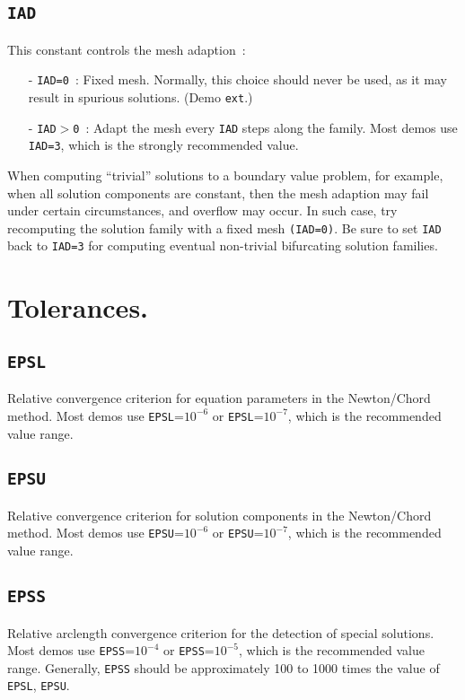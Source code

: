 \documentclass[12pt]{report}
\begin{document}
\subsection{\tt IAD} \label{sec:IAD}
This constant controls the mesh adaption~: 
\begin{itemize}
\item[-] {\tt IAD=0}~:
  Fixed mesh. Normally, this choice should never be used, as it may result
  in spurious solutions. (Demo {\tt ext}.)
\item[-] {\tt IAD$>$0}~:  
  Adapt the mesh every {\tt IAD} steps along the family.
  Most demos use {\tt IAD=3}, which is the strongly recommended value.
\end{itemize}

When computing  ``trivial'' solutions to a boundary value problem,
for example, when all solution components are constant, then the
mesh adaption may fail under certain circumstances, and overflow may
occur. In such case, try recomputing the solution family with a fixed
mesh {\tt (IAD=0)}. Be sure to set  {\tt IAD} back to {\tt IAD=3} 
for computing eventual non-trivial bifurcating solution families.
\section{ Tolerances.} \label{sec:Tolerances}
\subsection{\tt EPSL}  \label{sec:EPSL}
 Relative convergence criterion for equation parameters in the Newton/Chord 
 method. Most demos use {\tt EPSL}=$10^{-6}$ or {\tt EPSL}=$10^{-7}$,
 which is the recommended value range.

\subsection{\tt EPSU}  \label{sec:EPSU}
 Relative convergence criterion for solution components in the Newton/Chord 
 method. Most demos use {\tt EPSU}=$10^{-6}$ or {\tt EPSU}=$10^{-7}$,
 which is the recommended value range.

\subsection{\tt EPSS}  \label{sec:EPSS}
 Relative arclength convergence criterion for the detection of special solutions. 
 Most demos use {\tt EPSS}=$10^{-4}$ or  {\tt EPSS}=$10^{-5}$,
 which is the recommended value range.
 Generally, {\tt EPSS} should be approximately 100 to 1000 times the value
 of {\tt EPSL}, {\tt EPSU}.
 
\end{document}

